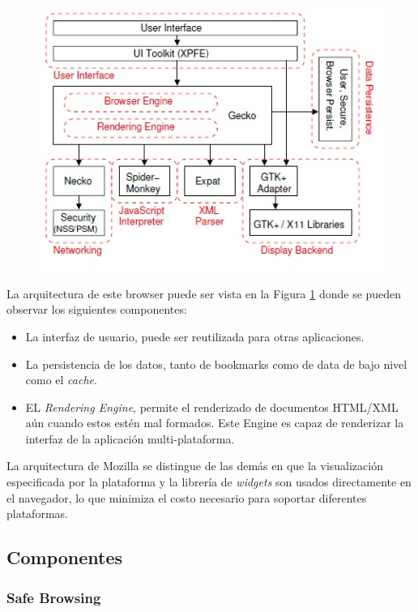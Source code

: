         \begin{figure}[h!t]
		    \begin{center}
				\includegraphics[scale=0.8]{figures/archMoz.jpg}
		      \label{fig:archM}
		    \end{center}
		\end{figure}
        
        La arquitectura de este browser puede ser vista en la Figura \ref{fig:archM} donde se pueden observar los siguientes componentes:
        \begin{itemize}
            \item La interfaz de usuario, puede ser reutilizada para otras aplicaciones.
            \item La persistencia de los datos, tanto de bookmarks como de data de bajo nivel como el \textit{cache}.
            \item EL \textit{Rendering Engine}, permite el renderizado de documentos HTML/XML aún cuando estos estén mal formados. Este Engine es capaz de renderizar la interfaz de la aplicación multi-plataforma.
        \end{itemize}
        La arquitectura de Mozilla se distingue de las demás en que la visualización especificada por la plataforma y la librería de \textit{widgets} son usados directamente en el navegador, lo que minimiza el costo necesario para soportar diferentes plataformas.
        
\subsection{Componentes}
	\subsubsection{Safe Browsing}



